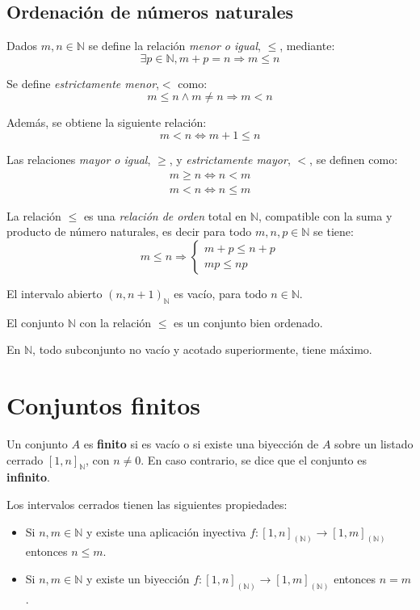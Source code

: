 \subsection{Ordenación de números naturales}

Dados $m,n \in \mathbb{N}$ se define la relación \emph{menor o igual}, $\leq$, mediante:
\[
\exists p \in \mathbb{N}, m + p = n \Rightarrow m \leq n
\]

Se define \emph{estrictamente menor},$<$ como:
\[
m \leq n \wedge m \neq n \Rightarrow m < n
\]

Además, se obtiene la siguiente relación:
\[
m < n \Leftrightarrow m + 1 \leq n
\]

Las relaciones \emph{mayor o igual}, $\geq$, y \emph{estrictamente mayor}, $<$, se definen como:
\begin{align*}
m \geq n \Leftrightarrow n < m \\
m < n \Leftrightarrow n \leq m
\end{align*}

La relación $\leq$ es una \emph{relación de orden} total en $\mathbb{N}$, compatible con la suma y producto de número naturales, es decir para todo $m,n,p \in \mathbb{N}$ se tiene:
\[
m \leq n \Rightarrow \begin{cases}
m+p \leq n+p \\
mp \leq np
\end{cases}
\]

El intervalo abierto $(n, n+1)_{\mathbb{N}}$ es vacío, para todo $n \in \mathbb{N}$.

El conjunto $\mathbb{N}$ con la relación $\leq$ es un conjunto bien ordenado.

En $\mathbb{N}$, todo subconjunto no vacío y acotado superiormente, tiene máximo.

\section{Conjuntos finitos}

Un conjunto $A$ es \textbf{finito} si es vacío o si existe una biyección de $A$ sobre un listado cerrado $[1,n]_{\mathbb{N}}$, con $n \neq 0$. En caso contrario, se dice que el conjunto es \textbf{infinito}.

Los intervalos cerrados tienen las siguientes propiedades:
\begin{itemize}
	\item Si $n,m \in \mathbb{N}$ y existe una aplicación inyectiva $f: [1,n]_{\mathbb{(N)}} \longrightarrow [1,m]_{\mathbb{(N)}}$ entonces $n \leq m$.
	\item Si $n,m \in \mathbb{N}$ y existe un biyección $f: [1,n]_{\mathbb{(N)}} \longrightarrow [1,m]_{\mathbb{(N)}}$ entonces $n=m$.
\end{itemize}

